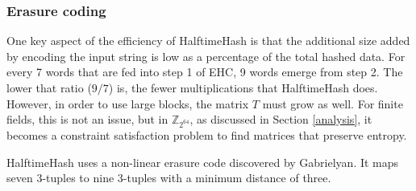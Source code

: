 \documentclass[runningheads]{llncs}
\newcommand{\ints}{\mathbb{Z}}
\begin{document}

\subsubsection{Erasure coding}

One key aspect of the efficiency of HalftimeHash is that the additional size added by encoding the input string is low as a percentage of the total hashed data.
For every 7 words that are fed into step 1 of EHC, 9 words emerge from step 2.
The lower that ratio ($9/7$) is, the fewer multiplications that HalftimeHash does.
However, in order to use large blocks, the matrix $T$ must grow as well.
For finite fields, this is not an issue, but in $\ints_{2^{64}}$, as discussed in Section \ref{analysis}, it becomes a constraint satisfaction problem to find matrices that preserve entropy.


HalftimeHash uses a non-linear erasure code discovered by Gab\-ri\-el\-yan. \cite{9-7-erasure-code}
It maps seven 3-tuples to nine 3-tuples with a minimum distance of three.


\end{document}
